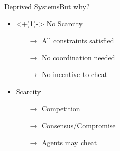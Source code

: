 \documentclass[aspectratio=169]{beamer}
\begin{document}
\begin{frame}{Deprived Systems}{But why?}
  \centering
  \begin{minipage}[t]{.45\linewidth}
    \begin{itemize}
      \item<+(1)-> No Scarcity
            \begin{itemize}[<+(1)->]
              \item[$\to$] All constraints satisfied
              \item[$\to$] No coordination needed
              \item[$\to$] No incentive to cheat
            \end{itemize}
    \end{itemize}
  \end{minipage}
  \hfill
  \begin{minipage}[t]{.45\linewidth}
    \begin{itemize}[<+(1)->]
      \item Scarcity
            \begin{itemize}[<+(1)->]
              \item[$\to$] Competition
              \item[$\to$] Consensus/Compromise
              \item[$\to$] Agents may cheat {\color{red}\faUserSecret}
            \end{itemize}
    \end{itemize}
  \end{minipage}
\end{frame}
\end{document}

